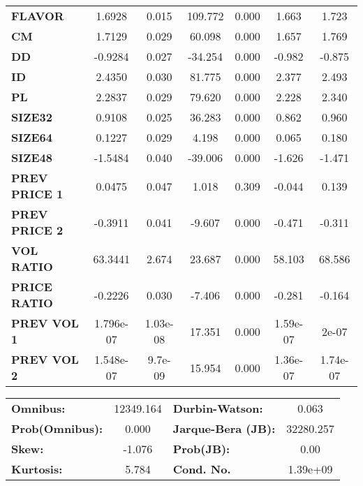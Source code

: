 \documentclass{article}
\begin{document}
\begin{center}
\begin{tabular}{lcccccc}
\textbf{FLAVOR}    &       1.6928  &        0.015     &   109.772  &         0.000        &        1.663    &        1.723     \\
\textbf{CM}    &       1.7129  &        0.029     &    60.098  &         0.000        &        1.657    &        1.769     \\
\textbf{DD}    &      -0.9284  &        0.027     &   -34.254  &         0.000        &       -0.982    &       -0.875     \\
\textbf{ID}    &       2.4350  &        0.030     &    81.775  &         0.000        &        2.377    &        2.493     \\
\textbf{PL}    &       2.2837  &        0.029     &    79.620  &         0.000        &        2.228    &        2.340     \\
\textbf{SIZE32}    &       0.9108  &        0.025     &    36.283  &         0.000        &        0.862    &        0.960     \\
\textbf{SIZE64}   &       0.1227  &        0.029     &     4.198  &         0.000        &        0.065    &        0.180     \\
\textbf{SIZE48}   &      -1.5484  &        0.040     &   -39.006  &         0.000        &       -1.626    &       -1.471     \\
\textbf{PREV PRICE 1}   &       0.0475  &        0.047     &     1.018  &         0.309        &       -0.044    &        0.139     \\
\textbf{PREV PRICE 2}   &      -0.3911  &        0.041     &    -9.607  &         0.000        &       -0.471    &       -0.311     \\
\textbf{VOL RATIO}   &      63.3441  &        2.674     &    23.687  &         0.000        &       58.103    &       68.586     \\
\textbf{PRICE RATIO}   &      -0.2226  &        0.030     &    -7.406  &         0.000        &       -0.281    &       -0.164     \\
\textbf{PREV VOL 1}   &    1.796e-07  &     1.03e-08     &    17.351  &         0.000        &     1.59e-07    &        2e-07     \\
\textbf{PREV VOL 2}   &    1.548e-07  &      9.7e-09     &    15.954  &         0.000        &     1.36e-07    &     1.74e-07     \\
\bottomrule
\end{tabular}
\begin{tabular}{lclc}
\textbf{Omnibus:}       & 12349.164 & \textbf{  Durbin-Watson:     } &     0.063  \\
\textbf{Prob(Omnibus):} &    0.000  & \textbf{  Jarque-Bera (JB):  } & 32280.257  \\
\textbf{Skew:}          &   -1.076  & \textbf{  Prob(JB):          } &      0.00  \\
\textbf{Kurtosis:}      &    5.784  & \textbf{  Cond. No.          } &  1.39e+09  \\
\bottomrule
\end{tabular}
\end{center}
\end{document}
